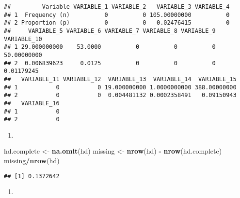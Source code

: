\documentclass[]{article}
\newenvironment{Shaded}{\begin{snugshade}}{\end{snugshade}}
\newcommand{\KeywordTok}[1]{\textcolor[rgb]{0.13,0.29,0.53}{\textbf{#1}}}
\newcommand{\NormalTok}[1]{#1}
\newcommand{\OperatorTok}[1]{\textcolor[rgb]{0.81,0.36,0.00}{\textbf{#1}}}
\newcommand{\StringTok}[1]{\textcolor[rgb]{0.31,0.60,0.02}{#1}}
\begin{document}
\begin{verbatim}
##         Variable VARIABLE_1 VARIABLE_2   VARIABLE_3 VARIABLE_4
## 1  Frequency (n)          0          0 105.00000000          0
## 2 Proportion (p)          0          0   0.02476415          0
##     VARIABLE_5 VARIABLE_6 VARIABLE_7 VARIABLE_8 VARIABLE_9 VARIABLE_10
## 1 29.000000000    53.0000          0          0          0 50.00000000
## 2  0.006839623     0.0125          0          0          0  0.01179245
##   VARIABLE_11 VARIABLE_12  VARIABLE_13  VARIABLE_14  VARIABLE_15
## 1           0           0 19.000000000 1.0000000000 388.00000000
## 2           0           0  0.004481132 0.0002358491   0.09150943
##   VARIABLE_16
## 1           0
## 2           0
\end{verbatim}

\begin{enumerate}
\def\labelenumi{\alph{enumi})}
\setcounter{enumi}{1}
\item
\end{enumerate}

\begin{Shaded}
\begin{Highlighting}[]
\NormalTok{hd.complete <-}\StringTok{ }\KeywordTok{na.omit}\NormalTok{(hd)}
\NormalTok{missing <-}\StringTok{ }\KeywordTok{nrow}\NormalTok{(hd) }\OperatorTok{-}\StringTok{ }\KeywordTok{nrow}\NormalTok{(hd.complete)}
\NormalTok{missing}\OperatorTok{/}\KeywordTok{nrow}\NormalTok{(hd)}
\end{Highlighting}
\end{Shaded}

\begin{verbatim}
## [1] 0.1372642
\end{verbatim}

\begin{enumerate}
\def\labelenumi{\alph{enumi})}
\setcounter{enumi}{2}
\item
\end{enumerate}
\end{document}
